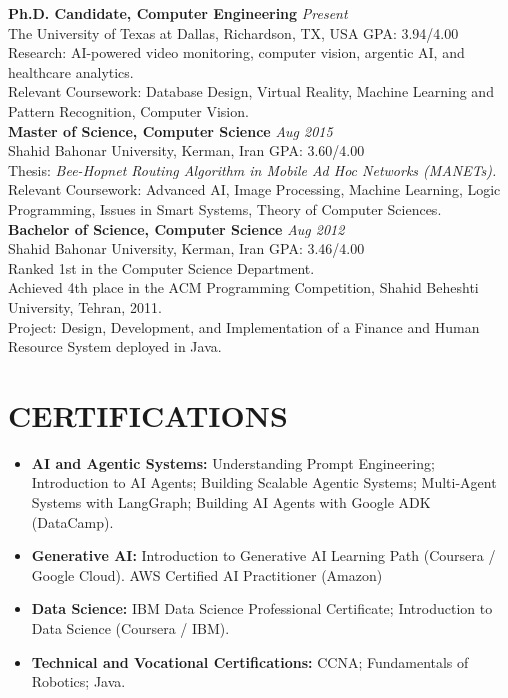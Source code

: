 \documentclass[10pt,a4paper,sans]{moderncv}
\begin{document}
{\textbf{Ph.D. Candidate, Computer Engineering} \hfill \textit{Present}\\
The University of Texas at Dallas, Richardson, TX, USA \hfill GPA: 3.94/4.00\\[1pt]
Research: AI-powered video monitoring, computer vision, argentic AI, and healthcare analytics.\\[1pt]
Relevant Coursework: Database Design, Virtual Reality, Machine Learning and Pattern Recognition, Computer Vision.
}\\[5pt]
{\textbf{Master of Science, Computer Science} \hfill \textit{Aug 2015}\\
Shahid Bahonar University, Kerman, Iran \hfill GPA: 3.60/4.00\\[1pt]
Thesis: \textit{Bee-Hopnet Routing Algorithm in Mobile Ad Hoc Networks (MANETs).}\\[1pt]
Relevant Coursework: Advanced AI, Image Processing, Machine Learning, Logic Programming, Issues in Smart Systems, Theory of Computer Sciences.
}\\[5pt]
{\textbf{Bachelor of Science, Computer Science} \hfill \textit{Aug 2012}\\
Shahid Bahonar University, Kerman, Iran \hfill GPA: 3.46/4.00\\[1pt]
Ranked 1st in the Computer Science Department.\\[1pt]
Achieved 4th place in the ACM Programming Competition, Shahid Beheshti University, Tehran, 2011.\\[1pt]
Project: Design, Development, and Implementation of a Finance and Human Resource System deployed in Java.
}

\vspace*{-3mm}
\section{CERTIFICATIONS}

\begin{itemize}[leftmargin=0.35cm, label={\textbullet}, itemsep=0.3em, parsep=0pt]
    \item \textbf{AI and Agentic Systems:} Understanding Prompt Engineering; Introduction to AI Agents; Building Scalable Agentic Systems; Multi-Agent Systems with LangGraph; Building AI Agents with Google ADK (DataCamp).
\item \textbf{Generative AI:} Introduction to Generative AI Learning Path (Coursera / Google Cloud). AWS Certified AI Practitioner (Amazon)
    \item \textbf{Data Science:} IBM Data Science Professional Certificate; Introduction to Data Science (Coursera / IBM).
    \item \textbf{Technical and Vocational Certifications:} CCNA; Fundamentals of Robotics; Java.
\end{itemize}
\end{document}
